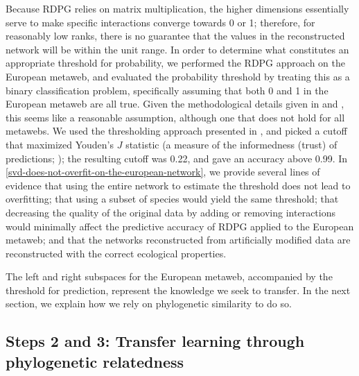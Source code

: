 Because RDPG relies on matrix multiplication, the higher dimensions
essentially serve to make specific interactions converge towards 0 or 1;
therefore, for reasonably low ranks, there is no guarantee that the
values in the reconstructed network will be within the unit range. In
order to determine what constitutes an appropriate threshold for
probability, we performed the RDPG approach on the European metaweb, and
evaluated the probability threshold by treating this as a binary
classification problem, specifically assuming that both 0 and 1 in the
European metaweb are all true. Given the methodological details given in
\cite{Maiorano2020TetSpe} and \cite{OConnor2020UnvFoo}, this seems like a reasonable
assumption, although one that does not hold for all metawebs. We used
the thresholding approach presented in \cite{Poisot2021ImpMam}, and picked a
cutoff that maximized Youden's \(J\) statistic (a measure of the
informedness (trust) of predictions; \cite{Youden1950IndRat}); the resulting
cutoff was 0.22, and gave an accuracy above 0.99. In \autoref{svd-does-not-overfit-on-the-european-network}, we
provide several lines of evidence that using the entire network to
estimate the threshold does not lead to overfitting; that using a subset
of species would yield the same threshold; that decreasing the quality
of the original data by adding or removing interactions would minimally
affect the predictive accuracy of RDPG applied to the European metaweb;
and that the networks reconstructed from artificially modified data are
reconstructed with the correct ecological properties.

The left and right subspaces for the European metaweb, accompanied by
the threshold for prediction, represent the knowledge we seek to
transfer. In the next section, we explain how we rely on phylogenetic
similarity to do so.

\subsection{Steps 2 and 3: Transfer learning through phylogenetic
relatedness}\label{steps-2-and-3-transfer-learning-through-phylogenetic-relatedness}

